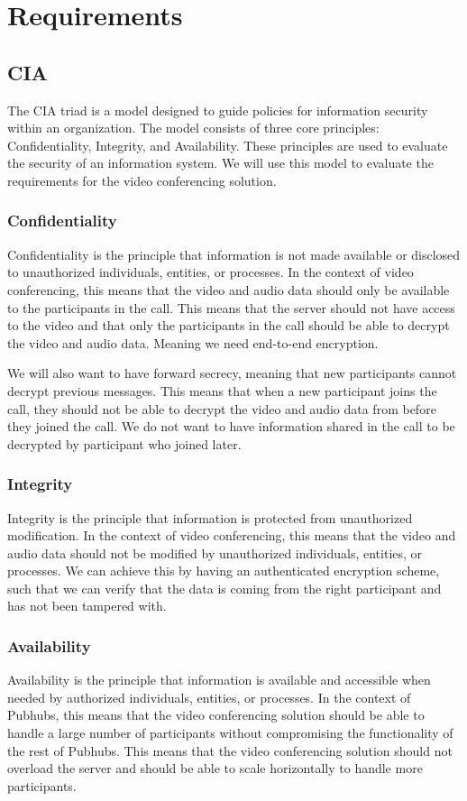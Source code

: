 \documentclass{report}
\begin{document}
\chapter{Requirements}
\section{CIA}
The CIA triad is a model designed to guide policies for information security within an organization. The model
consists of three core principles: Confidentiality, Integrity, and Availability. These principles are used to
evaluate the security of an information system. We will use this model to evaluate the requirements for the video
conferencing solution.

\subsection{Confidentiality}
Confidentiality is the principle that information is not made available or disclosed to unauthorized individuals,
entities, or processes. In the context of video conferencing, this means that the video and audio data should only
be available to the participants in the call. This means that the server should not have access to the video and
that only the participants in the call should be able to decrypt the video and audio data. Meaning we need end-to-end
encryption.

We will also want to have forward secrecy, meaning that new participants cannot decrypt previous messages. This
means that when a new participant joins the call, they should not be able to decrypt the video and audio data from
before they joined the call. We do not want to have information shared in the call to be decrypted by participant who
joined later.

\subsection{Integrity}
Integrity is the principle that information is protected from unauthorized modification. In the context of video
conferencing, this means that the video and audio data should not be modified by unauthorized individuals, entities,
or processes. We can achieve this by having an authenticated encryption scheme, such that we can verify that the
data is coming from the right participant and has not been tampered with.

\subsection{Availability}
Availability is the principle that information is available and accessible when needed by authorized individuals,
entities, or processes. In the context of Pubhubs, this means that the video conferencing solution should be able to
handle a large number of participants without compromising the functionality of the rest of Pubhubs. This means that
the video conferencing solution should not overload the server and should be able to scale horizontally to handle
more participants.
\end{document}

